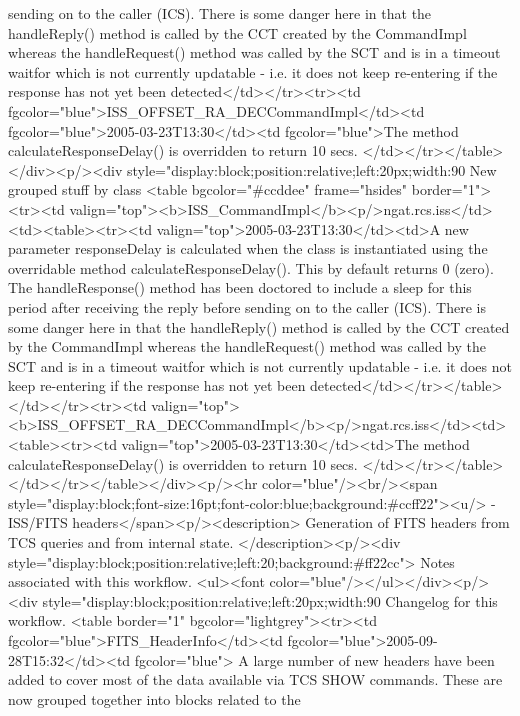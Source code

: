 	  sending on to the caller (ICS). There is some danger here in that the handleReply() method is called by
	  the CCT created by the CommandImpl whereas the handleRequest() method was called by the SCT and is in a 
	  timeout waitfor which is not currently updatable - i.e. it does not keep re-entering if the response
	  has not yet been detected</td></tr><tr><td fgcolor="blue">ISS_OFFSET_RA_DECCommandImpl</td><td fgcolor="blue">2005-03-23T13:30</td><td fgcolor="blue">The method calculateResponseDelay() is overridden to return 10 secs.
	  </td></tr></table></div><p/><div style="display:block;position:relative;left:20px;width:90%
     New grouped stuff by class
     <table bgcolor="#ccddee" frame="hsides" border="1"><tr><td valign="top"><b>ISS_CommandImpl</b><p/>ngat.rcs.iss</td><td><table><tr><td valign="top">2005-03-23T13:30</td><td>A new parameter responseDelay is calculated when the class is instantiated using
	    the overridable method calculateResponseDelay(). This by default returns 0 (zero). The 
	    handleResponse() method has been doctored to include a sleep for this period after receiving the reply before
	  sending on to the caller (ICS). There is some danger here in that the handleReply() method is called by
	  the CCT created by the CommandImpl whereas the handleRequest() method was called by the SCT and is in a 
	  timeout waitfor which is not currently updatable - i.e. it does not keep re-entering if the response
	  has not yet been detected</td></tr></table></td></tr><tr><td valign="top"><b>ISS_OFFSET_RA_DECCommandImpl</b><p/>ngat.rcs.iss</td><td><table><tr><td valign="top">2005-03-23T13:30</td><td>The method calculateResponseDelay() is overridden to return 10 secs.
	  </td></tr></table></td></tr></table></div><p/><hr color="blue"/><br/><span style="display:block;font-size:16pt;font-color:blue;background:#ccff22"><u/> -    ISS/FITS headers</span><p/><description>
	Generation of FITS headers from TCS queries and from internal state.
      </description><p/><div style="display:block;position:relative;left:20;background:#ff22cc">
      Notes associated with this workflow.
      <ul><font color="blue"/></ul></div><p/><div style="display:block;position:relative;left:20px;width:90%
      Changelog for this workflow.
      <table border="1" bgcolor="lightgrey"><tr><td fgcolor="blue">FITS_HeaderInfo</td><td fgcolor="blue">2005-09-28T15:32</td><td fgcolor="blue">
	    A large number of new headers have been added to cover most of the data available
	    via TCS SHOW commands. These are now grouped together into blocks related to the
